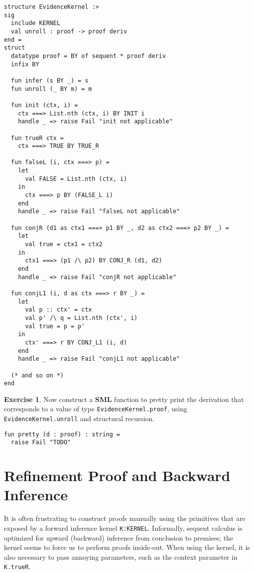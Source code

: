 \documentclass{article}
\newcommand\FormatLang[1]{{\bfseries\sffamily #1}}
\newcommand\SML{\FormatLang{SML}}
\theoremstyle{definition}
\newtheorem{exercise}{Exercise}[section]
\theoremstyle{remark}
\begin{document}
\begin{verbatim}
structure EvidenceKernel :>
sig
  include KERNEL
  val unroll : proof -> proof deriv
end =
struct
  datatype proof = BY of sequent * proof deriv
  infix BY

  fun infer (s BY _) = s
  fun unroll (_ BY m) = m

  fun init (ctx, i) =
    ctx ===> List.nth (ctx, i) BY INIT i
    handle _ => raise Fail "init not applicable"

  fun trueR ctx =
    ctx ===> TRUE BY TRUE_R

  fun falseL (i, ctx ===> p) =
    let
      val FALSE = List.nth (ctx, i)
    in
      ctx ===> p BY (FALSE_L i)
    end
    handle _ => raise Fail "falseL not applicable"

  fun conjR (d1 as ctx1 ===> p1 BY _, d2 as ctx2 ===> p2 BY _) =
    let
      val true = ctx1 = ctx2
    in
      ctx1 ===> (p1 /\ p2) BY CONJ_R (d1, d2)
    end
    handle _ => raise Fail "conjR not applicable"

  fun conjL1 (i, d as ctx ===> r BY _) =
    let
      val p :: ctx' = ctx
      val p' /\ q = List.nth (ctx', i)
      val true = p = p'
    in
      ctx' ===> r BY CONJ_L1 (i, d)
    end
    handle _ => raise Fail "conjL1 not applicable"

  (* and so on *)
end
\end{verbatim}

\begin{exercise}
  Now construct a \SML{} function to pretty print the derivation that
  corresponds to a value of type \verb|EvidenceKernel.proof|, using
  \verb|EvidenceKernel.unroll| and structural recursion.
\begin{verbatim}
fun pretty (d : proof) : string =
  raise Fail "TODO"
\end{verbatim}
\end{exercise}


\section{Refinement Proof and Backward Inference}

It is often frustrating to construct proofs manually using the
primitives that are exposed by a forward inference kernel
\verb|K:KERNEL|. Informally, sequent calculus is optimized for upward
(backward) inference from conclusion to premises; the kernel seems to
force us to perform proofs inside-out. When using the kernel, it is
also necessary to pass annoying parameters, such as the context
parameter in \verb|K.trueR|.
\end{document}
